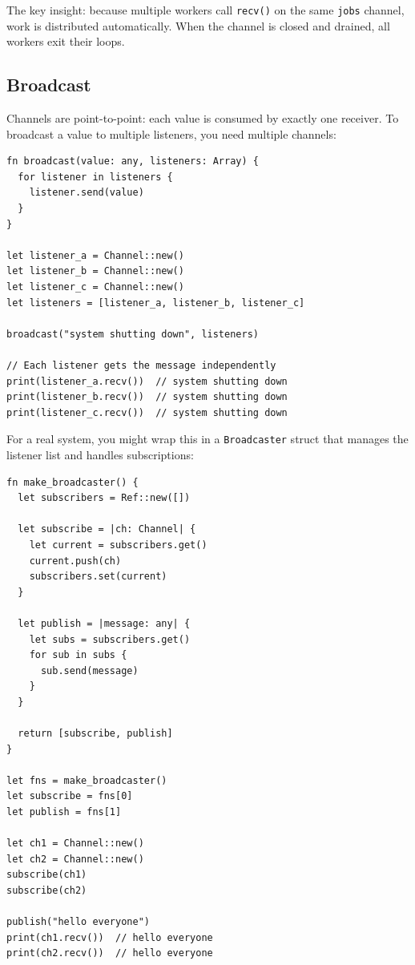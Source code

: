 The key insight: because multiple workers call \lstinline|recv()| on the same \lstinline|jobs| channel, work is distributed automatically.
When the channel is closed and drained, all workers exit their loops.

\subsection{Broadcast}\label{subsec:broadcast}


Channels are point-to-point: each value is consumed by exactly one receiver.
To broadcast a value to multiple listeners, you need multiple channels:

\begin{lstlisting}[language=Lattice, caption={Broadcast pattern}]
fn broadcast(value: any, listeners: Array) {
  for listener in listeners {
    listener.send(value)
  }
}

let listener_a = Channel::new()
let listener_b = Channel::new()
let listener_c = Channel::new()
let listeners = [listener_a, listener_b, listener_c]

broadcast("system shutting down", listeners)

// Each listener gets the message independently
print(listener_a.recv())  // system shutting down
print(listener_b.recv())  // system shutting down
print(listener_c.recv())  // system shutting down
\end{lstlisting}

For a real system, you might wrap this in a \lstinline|Broadcaster| struct that manages the listener list and handles subscriptions:

\begin{lstlisting}[language=Lattice, caption={Broadcaster with subscribers}]
fn make_broadcaster() {
  let subscribers = Ref::new([])

  let subscribe = |ch: Channel| {
    let current = subscribers.get()
    current.push(ch)
    subscribers.set(current)
  }

  let publish = |message: any| {
    let subs = subscribers.get()
    for sub in subs {
      sub.send(message)
    }
  }

  return [subscribe, publish]
}

let fns = make_broadcaster()
let subscribe = fns[0]
let publish = fns[1]

let ch1 = Channel::new()
let ch2 = Channel::new()
subscribe(ch1)
subscribe(ch2)

publish("hello everyone")
print(ch1.recv())  // hello everyone
print(ch2.recv())  // hello everyone
\end{lstlisting}

